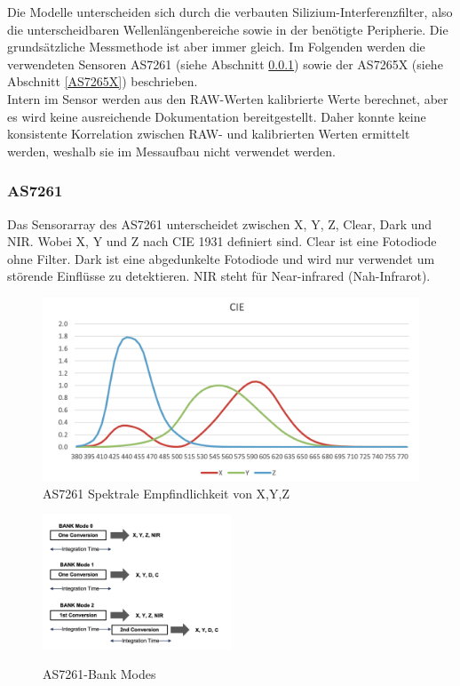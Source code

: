 \noindent Die Modelle unterscheiden sich durch die verbauten Silizium-Interferenzfilter, also die unterscheidbaren Wellenlängenbereiche sowie in der benötigte Peripherie.
Die grundsätzliche Messmethode ist aber immer gleich.
Im Folgenden werden die verwendeten Sensoren AS7261 (siehe Abschnitt \ref{AS7261}) sowie der AS7265X (siehe Abschnitt \ref{AS7265X}) beschrieben.\\
Intern im Sensor werden aus den RAW-Werten kalibrierte Werte berechnet, aber es wird keine ausreichende Dokumentation bereitgestellt.
Daher konnte keine konsistente Korrelation zwischen RAW- und kalibrierten Werten ermittelt werden, weshalb sie im Messaufbau nicht verwendet werden.


\newpage
\subsubsection{AS7261}\label{AS7261}
Das Sensorarray des AS7261 unterscheidet zwischen X, Y, Z, Clear, Dark und NIR.
Wobei X, Y und Z nach CIE 1931 definiert sind.
Clear ist eine Fotodiode ohne Filter.
Dark ist eine abgedunkelte Fotodiode und wird nur verwendet um störende Einflüsse zu detektieren.
NIR steht für Near-infrared  (Nah-Infrarot).\\

\begin{figure}[H]
  \centering
 \includegraphics[width=0.6\linewidth]{img/AS7261-Spectral_Responsivity.png}
  \caption{AS7261 Spektrale Empfindlichkeit von X,Y,Z \cite{Datenblatt_AS7261}}
  \label{fig:AS7261-Spectral_Responsivity}
\end{figure}


\begin{figure}
\centering
\includegraphics[width=0.5\textwidth]{img/AS7261-Bank_Modes.png}
\label{fig:AS7261-Bank_Modes}
\caption{AS7261-Bank Modes \cite{Datenblatt_AS7261}}
\end{figure}

